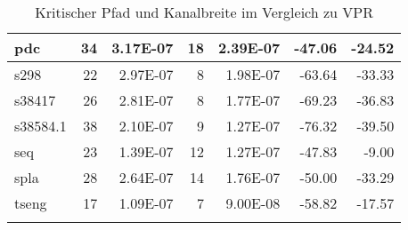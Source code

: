 \begin{center}
\begin{longtable}{| l | r | r | r | r | r | r |}
                    pdc         &   34  &   3.17E-07    &   18  &   2.39E-07    &   -47.06  &   -24.52   \\ \hline        
                    s298        &   22  &   2.97E-07    &   8   &   1.98E-07    &   -63.64  &   -33.33   \\ \hline        
                    s38417      &   26  &   2.81E-07    &   8   &   1.77E-07    &   -69.23  &   -36.83   \\ \hline        
                    s38584.1    &   38  &   2.10E-07    &   9   &   1.27E-07    &   -76.32  &   -39.50   \\ \hline        
                    seq         &   23  &   1.39E-07    &   12  &   1.27E-07    &   -47.83  &   -9.00    \\ \hline        
                    spla        &   28  &   2.64E-07    &   14  &   1.76E-07    &   -50.00  &   -33.29   \\ \hline        
                    tseng       &   17  &   1.09E-07    &   7   &   9.00E-08    &   -58.82  &   -17.57   \\ \hline        
                \caption{Kritischer Pfad und Kanalbreite im Vergleich zu VPR}
                \label{tab:routing}
            \end{longtable}
        \end{center}